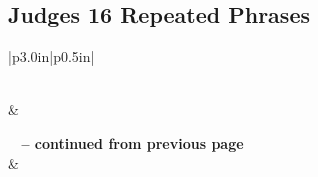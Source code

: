 \subsection{Judges 16 Repeated Phrases}


\normalsize
 
\begin{center}
\begin{longtable}{|p{3.0in}|p{0.5in}|}
\caption[Judges 16 Repeated Phrases]{Judges 16 Repeated Phrases}\label{table:Repeated Phrases Judges 16} \\
\hline {} &  \\ \hline 
\endfirsthead
 
{{\bfseries \tablename\ \thetable{} -- continued from previous page}} \\  
\hline {} &  \\ \hline 
\endhead
 

\end{longtable}
\end{center}

